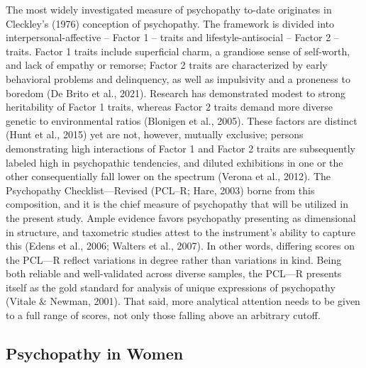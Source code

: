 \documentclass[
  man,floatsintext]{apa7}
\begin{document}
The most widely investigated measure of psychopathy to-date originates in Cleckley's (1976) conception of psychopathy. The framework is divided into interpersonal-affective -- Factor 1 -- traits and lifestyle-antisocial -- Factor 2 -- traits. Factor 1 traits include superficial charm, a grandiose sense of self-worth, and lack of empathy or remorse; Factor 2 traits are characterized by early behavioral problems and delinquency, as well as impulsivity and a proneness to boredom (De Brito et al., 2021). Research has demonstrated modest to strong heritability of Factor 1 traits, whereas Factor 2 traits demand more diverse genetic to environmental ratios (Blonigen et al., 2005). These factors are distinct (Hunt et al., 2015) yet are not, however, mutually exclusive; persons demonstrating high interactions of Factor 1 and Factor 2 traits are subsequently labeled high in psychopathic tendencies, and diluted exhibitions in one or the other consequentially fall lower on the spectrum (Verona et al., 2012). The Psychopathy Checklist---Revised (PCL--R; Hare, 2003) borne from this composition, and it is the chief measure of psychopathy that will be utilized in the present study. Ample evidence favors psychopathy presenting as dimensional in structure, and taxometric studies attest to the instrument's ability to capture this (Edens et al., 2006; Walters et al., 2007). In other words, differing scores on the PCL---R reflect variations in degree rather than variations in kind. Being both reliable and well-validated across diverse samples, the PCL---R presents itself as the gold standard for analysis of unique expressions of psychopathy (Vitale \& Newman, 2001). That said, more analytical attention needs to be given to a full range of scores, not only those falling above an arbitrary cutoff.

\hypertarget{psychopathy-in-women}{%
\subsection{Psychopathy in Women}\label{psychopathy-in-women}}
\end{document}
